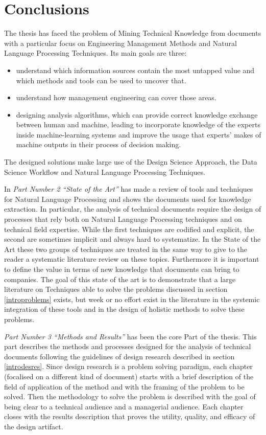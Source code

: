 \documentclass[]{book}
\providecommand{\tightlist}{%
  \setlength{\itemsep}{0pt}\setlength{\parskip}{0pt}}
\theoremstyle{definition}
\theoremstyle{definition}
\theoremstyle{definition}
\theoremstyle{remark}
\begin{document}
\part{Conclusions}\label{part-conclusions}

The thesis has faced the problem of Mining Technical Knowledge from
documents with a particular focus on Engineering Management Methods and
Natural Language Processing Techniques. Its main goals are three:

\begin{itemize}
\tightlist
\item
  understand which information sources contain the most untapped value
  and which methods and tools can be used to uncover that.
\item
  understand how management engineering can cover those areas.
\item
  designing analysis algorithms, which can provide correct knowledge
  exchange between human and machine, leading to incorporate knowledge
  of the experts inside machine-learning systems and improve the usage
  that experts' makes of machine outputs in their process of decision
  making.
\end{itemize}

The designed solutions make large use of the Design Science Approach,
the Data Science Workflow and Natural Language Processing Techniques.

In \emph{Part Number 2 ``State of the Art''} has made a review of tools
and techniques for Natural Language Processing and shows the documents
used for knowledge extraction. In particular, the analysis of technical
documents require the design of processes that rely both on Natural
Language Processing techniques and on technical field expertise. While
the first techniques are codified and explicit, the second are sometimes
implicit and always hard to systematize. In the State of the Art these
two groups of techniques are treated in the same way to give to the
reader a systematic literature review on these topics. Furthermore it is
important to define the value in terms of new knowledge that documents
can bring to companies. The goal of this state of the art is to
demonstrate that a large literature on Techniques able to solve the
problems discussed in section \ref{introproblems} exists, but week or no
effort exist in the literature in the systemic integration of these
tools and in the design of holistic methods to solve these problems.

\emph{Part Number 3 ``Methods and Results''} has been the core Part of
the thesis. This part describes the methods and processes designed for
the analysis of technical documents following the guidelines of design
research described in section \ref{introdesres}. Since design research
is a problem solving paradigm, each chapter (focalised on a different
kind of document) starts with a brief description of the field of
application of the method and with the framing of the problem to be
solved. Then the methodology to solve the problem is described with the
goal of being clear to a technical audience and a managerial audience.
Each chapter closes with the results description that proves the
utility, quality, and efficacy of the design artifact.
\end{document}
